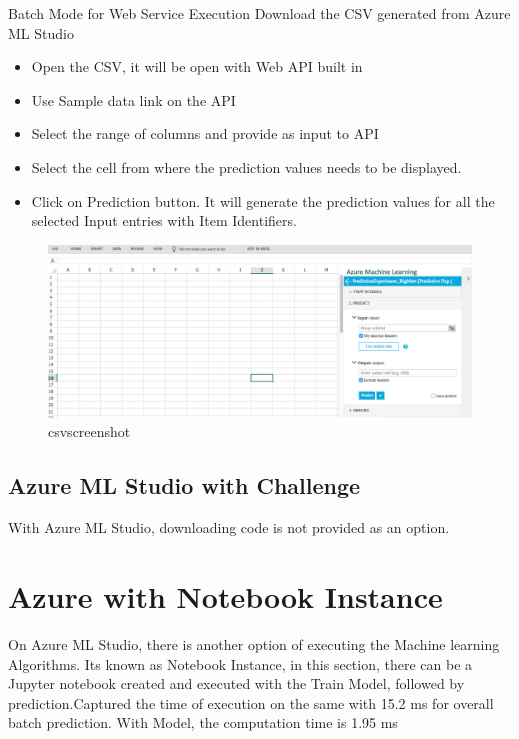 Batch Mode for Web Service Execution
Download the CSV generated from Azure ML Studio 
\begin{itemize}
\item Open the CSV, it will be open with Web API built in
\item Use Sample data link on the API
\item Select the range of columns and provide as input to API
\item Select the cell from where the prediction values needs to be displayed.
\item Click on Prediction button.
It will generate the prediction values for all the selected Input entries 
with Item Identifiers.
\end{itemize}

\begin{figure}[pic9]
\centering
\includegraphics[width=\columnwidth]{Images/mlstudio/csvscreenshot.png}
\caption{csvscreenshot}\label{fig:csvscreenshot}
\end{figure}

\subsection{Azure ML Studio with Challenge}
With Azure ML Studio, downloading code is not provided as an option.

\section{Azure with Notebook Instance}

On Azure ML Studio, there is another option of executing the Machine 
learning Algorithms. Its known as Notebook Instance, in this section, 
there can be a Jupyter notebook created and executed with the Train Model, 
followed by prediction.Captured the time of execution on the same with 15.2 ms 
for overall batch prediction. With Model, the computation time is 1.95 ms

